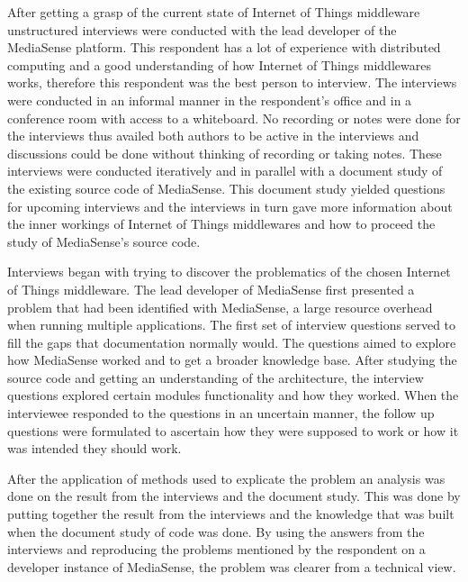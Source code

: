 After getting a grasp of the current state of Internet of Things middleware unstructured interviews were conducted with the lead developer of the MediaSense platform. This respondent has a lot of experience with distributed computing and a good understanding of how Internet of Things middlewares works, therefore this respondent was the best person to interview. The interviews were conducted in an informal manner in the respondent's office and in a conference room with access to a whiteboard. No recording or notes were done for the interviews thus availed both authors to be active in the interviews and discussions could be done without thinking of recording or taking notes. These interviews were conducted iteratively and in parallel with a document study of the existing source code of MediaSense. This document study yielded questions for upcoming interviews and the interviews in turn gave more information about the inner workings of Internet of Things middlewares and how to proceed the study of MediaSense's source code.

Interviews began with trying to discover the problematics of the chosen Internet of Things middleware. The lead developer of MediaSense first presented a problem that had been identified with MediaSense, a large resource overhead when running multiple applications. The first set of interview questions served to fill the gaps that documentation normally would. The questions aimed to explore how MediaSense worked and to get a broader knowledge base. After studying the source code and getting an understanding of the architecture, the interview questions explored certain modules functionality and how they worked. When the interviewee responded to the questions in an uncertain manner, the follow up questions were formulated to ascertain how they were supposed to work or how it was intended they should work.

After the application of methods used to explicate the problem an analysis was done on the result from the interviews and the document study. This was done by putting together the result from the interviews and the knowledge that was built when the document study of code was done. By using the answers from the interviews and reproducing the problems mentioned by the respondent on a developer instance of MediaSense, the problem was clearer from a technical view.
